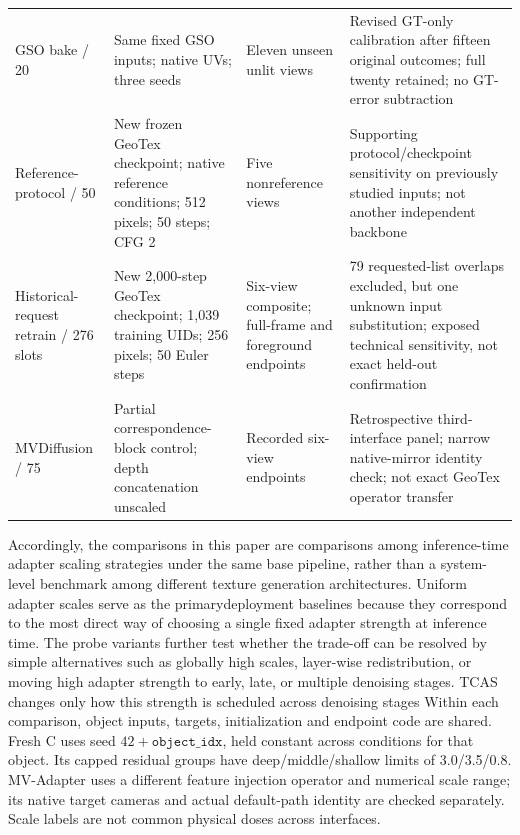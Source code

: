 \documentclass[times,twocolumn,final]{elsarticle}
\providecommand{\DIFadd}[1]{{\protect\color{blue} \sf #1}} %
\providecommand{\DIFdel}[1]{{\protect\color{red} \scriptsize #1}} %
\providecommand{\DIFaddbegin}{} %
\providecommand{\DIFaddend}{} %
\providecommand{\DIFdelbegin}{} %
\providecommand{\DIFdelend}{} %
\begin{document}
\begin{table}[t]
\begin{tabular}{p{}p{}p{}p{}}
GSO bake / 20 & Same fixed GSO inputs; native UVs; three seeds & Eleven unseen unlit views & Revised GT-only calibration after fifteen original outcomes; full twenty retained; no GT-error subtraction \\
Reference-protocol / 50 & New frozen GeoTex checkpoint; native reference conditions; 512 pixels; 50 steps; CFG 2 & Five nonreference views & Supporting protocol/checkpoint sensitivity on previously studied inputs; not another independent backbone \\
Historical-request retrain / 276 slots & New 2,000-step GeoTex checkpoint; 1,039 training UIDs; 256 pixels; 50 Euler steps & Six-view composite; full-frame and foreground endpoints & 79 requested-list overlaps excluded, but one unknown input substitution; exposed technical sensitivity, not exact held-out confirmation \\
MVDiffusion / 75 & Partial correspondence-block control; depth concatenation unscaled & Recorded six-view endpoints & Retrospective third-interface panel; narrow native-mirror identity check; not exact GeoTex operator transfer \\
\bottomrule
\end{tabular}
\end{table}
\DIFaddend 

\DIFdelbegin \DIFdel{Accordingly, the comparisons in this paper are comparisons among inference-time adapter scaling strategies under the same base pipeline, rather than a system-level benchmark among different texture generation architectures. Uniform adapter scales serve as the primarydeployment baselines because they correspond to the most direct way of choosing a single fixed adapter strength at inference time. The probe variants further test whether the trade-off can be resolved by simple alternatives such as globally high scales, layer-wise redistribution, or moving high adapter strength to early, late, or multiple denoising stages. TCAS changes only how this strength is scheduled across denoising stages}\DIFdelend \DIFaddbegin \DIFadd{Within each comparison, object inputs, targets, initialization and endpoint code are shared. Fresh C uses seed $42+\texttt{object\_idx}$, held constant across conditions for that object. Its capped residual groups have deep/middle/shallow limits of 3.0/3.5/0.8}\DIFaddend . \DIFaddbegin \DIFadd{MV-Adapter uses a different feature injection operator and numerical scale range; its native target cameras and actual default-path identity are checked separately. Scale labels are not common physical doses across interfaces.
}\DIFaddend 
\end{document}
